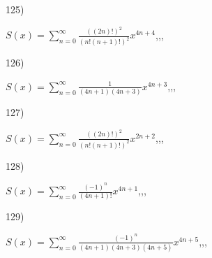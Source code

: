 \documentclass[11pt, ukrainian]{article}
\begin{document}
\par
\vspace{0.9cm}
125) \space 
{%
{$S(x)=\sum\limits_{n=0}^{\infty}{\frac{((2n)!)^2}{(n!(n+1)!)^2}}{x^{{4n+4}}}$},,, \par \smallskip  
}
\par
\vspace{0.9cm}
126) \space 
{%
{$S(x)=\sum\limits_{n=0}^{\infty}{\frac{1}{(4n+1)(4n+3)}}{x^{{4n+3}}}$},,, \par \smallskip  
}
\par
\vspace{0.9cm}
127) \space 
{%
{$S(x)=\sum\limits_{n=0}^{\infty}{\frac{((2n)!)^2}{(n!(n+1)!)^2}}{x^{{2n+2}}}$},,, \par \smallskip  
}
\par
\vspace{0.9cm}
128) \space 
{%
{$S(x)=\sum\limits_{n=0}^{\infty}{\frac{(-1)^n}{(4n+1)!}}{x^{{4n+1}}}$},,, \par \smallskip  
}
\par
\vspace{0.9cm}
129) \space 
{%
{$S(x)=\sum\limits_{n=0}^{\infty}{\frac{(-1)^n}{(4n+1)(4n+3)(4n+5)}}{x^{{4n+5}}}$},,, \par \smallskip  
}
\par
\end{document}
